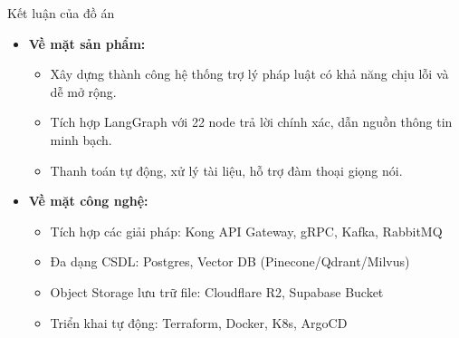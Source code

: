 \begin{frame}{Kết luận của đồ án}
\begin{itemize}
\item \textbf{Về mặt sản phẩm:}
\begin{itemize}
\item Xây dựng thành công hệ thống trợ lý pháp luật có khả năng chịu lỗi và dễ mở rộng.

\item Tích hợp LangGraph với 22 node trả lời chính xác, dẫn nguồn thông tin minh bạch.
\item Thanh toán tự động, xử lý tài liệu, hỗ trợ đàm thoại giọng nói.
\end{itemize}
\item \textbf{Về mặt công nghệ:}
\begin{itemize}

\item Tích hợp các giải pháp: Kong API Gateway, gRPC, Kafka, RabbitMQ
\item Đa dạng CSDL: Postgres, Vector DB (Pinecone/Qdrant/Milvus)
\item Object Storage lưu trữ file: Cloudflare R2, Supabase Bucket
\item Triển khai tự động: Terraform, Docker, K8s, ArgoCD

\end{itemize}

\end{itemize}

\end{frame}
